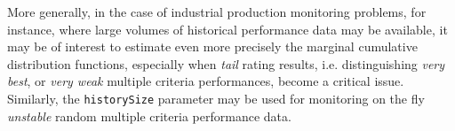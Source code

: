 More generally, in the case of industrial production monitoring problems, for instance, where large volumes of historical performance data may be available, it may be of interest to estimate even more precisely the marginal cumulative distribution functions, especially when \emph{tail} rating results, i.e. distinguishing \emph{very best}, or \emph{very weak} multiple criteria performances, become a critical issue. Similarly, the \texttt{historySize} parameter may be used for monitoring on the fly \emph{unstable} random multiple criteria performance data.  	

\clearpage
{}


% 
